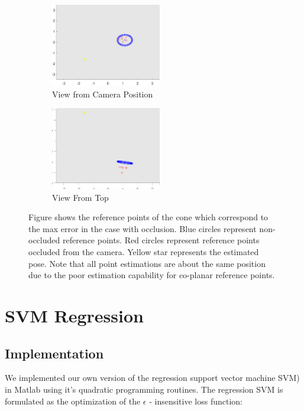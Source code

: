 \documentclass[journal]{IEEEtran}
\begin{document}
\begin{figure}
	\hspace{-10 ex}
	\begin{subfigure}{.3\textwidth}
		\centering
		\includegraphics[width=1.9in]{poor_cone_camera_view_w_error}
		\caption{View from Camera Position}
		\label{fig:vive}
	\end{subfigure}%
	\begin{subfigure}{.3\textwidth}
		\centering
		\includegraphics[width=1.9in]{poor_cone_topview_view_w_error}
		\caption{View From Top}
		\label{fig:oculus}
	\end{subfigure}
	\caption{Figure shows the reference points of the cone which correspond to the max error in the case with occlusion. Blue circles represent non-occluded reference points. Red circles represent reference points occluded from the camera. Yellow star represents the estimated pose. Note that all point estimations are about the same position due to the poor estimation capability for co-planar reference points.}
	\label{Fig:cone_performance}
\end{figure}


\section{SVM Regression}

\subsection{Implementation}
We implemented our own version of the regression support vector machine SVM) in Matlab using it's quadratic programming routines. The regression SVM is formulated as the optimization of the $\epsilon$ - insensitive loss function:
\end{document}
